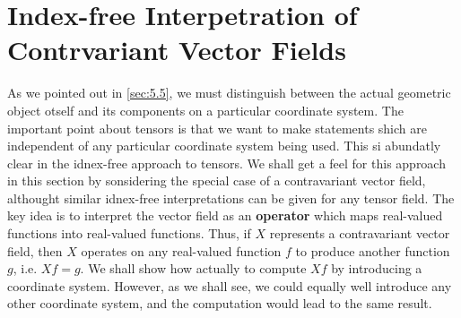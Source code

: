 \section{Index-free Interpetration of Contrvariant Vector Fields}\label{sec5.9}
As we pointed out in \ref{sec:5.5}, we must distinguish between the actual geometric object otself and its components on a particular coordinate system. The important point about tensors is that we want to make statements shich are independent of any particular coordinate system being used. This si abundatly clear in the idnex-free approach to tensors. We shall get a feel for this approach in this section by sonsidering the special case of a contravariant vector field, althought similar idnex-free interpretations can be given for any tensor field. The key idea is to interpret the vector field as an \textbf{operator} which maps real-valued functions into real-valued functions. Thus, if $X$ represents a contravariant vector field, then $X$ operates on any real-valued function $f$ to produce another function $g$, i.e. $Xf=g$. We shall show how actually to compute $Xf$ by introducing a coordinate system. However, as we shall see, we could equally well introduce any other coordinate system, and the computation would lead to the same result.

